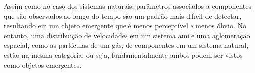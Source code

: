     Assim como no caso dos sistemas naturais, parâmetros associados a componentes que são observados ao longo do tempo são um padrão mais difícil de detectar, resultando em um objeto emergente que é menos perceptível e menos óbvio. No entanto, uma distribuição de velocidades em um sistema \acrshort{ami} e uma aglomeração espacial, como as partículas de um gás, de componentes em um sistema natural, estão na mesma categoria, ou seja, fundamentalmente ambos podem ser vistos como objetos emergentes.
  

